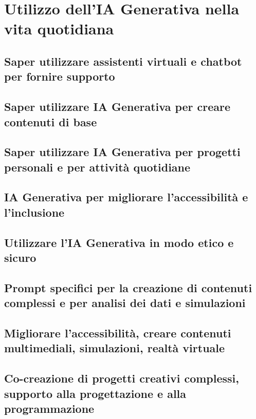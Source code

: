 \section{Utilizzo dell'IA Generativa nella vita quotidiana}
    
    \subsection{Saper utilizzare assistenti virtuali e chatbot per fornire supporto}
    
    \subsection{Saper utilizzare IA Generativa per creare contenuti di base}
    
    \subsection{Saper utilizzare IA Generativa per progetti personali e per attività quotidiane}
    
    \subsection{IA Generativa per migliorare l’accessibilità e l’inclusione}
    
    \subsection{Utilizzare l’IA Generativa in modo etico e sicuro}
    
    \subsection{Prompt specifici per la creazione di contenuti complessi e per analisi dei dati e simulazioni}
    
    \subsection{Migliorare l’accessibilità, creare contenuti multimediali, simulazioni, realtà virtuale}
    
    \subsection{Co-creazione di progetti creativi complessi, supporto alla progettazione e alla programmazione}
    
